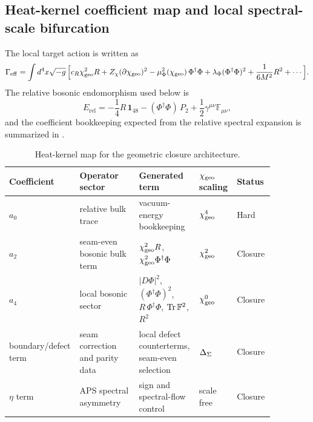 \subsection{Heat-kernel coefficient map and local spectral-scale bifurcation}

The local target action is written as
\begin{equation}
\label{eq:chi-effective-action}
\begin{aligned}
\Gamma_{\mathrm{eff}}
=
\int d^4x\sqrt{-g}\,
\Big[
c_R\chi_{\mathrm{geo}}^2R
+Z_\chi(\partial\chi_{\mathrm{geo}})^2
-\mu_\Phi^2(\chi_{\mathrm{geo}})\,\Phi^\dagger\Phi
+\lambda_\Phi(\Phi^\dagger\Phi)^2
+\frac{1}{6M^2}R^2
+\cdots
\Big].
\end{aligned}
\end{equation}
The relative bosonic endomorphism used below is
\begin{equation}
\label{eq:relative-bosonic-endomorphism}
E_{\mathrm{rel}}
=
-\frac14 R\,\mathbf 1_{48}
-
(\Phi^\dagger\Phi)\,P_2
+
\frac12\gamma^{\mu\nu}\mathbb F_{\mu\nu},
\end{equation}
and the coefficient bookkeeping expected from the relative spectral expansion is summarized in .

\begin{table}[t]
\centering
\small
\begin{tabularx}{\linewidth}{@{}>{\raggedright\arraybackslash}p{0.15\linewidth}>{\raggedright\arraybackslash}p{0.22\linewidth}>{\raggedright\arraybackslash}p{0.22\linewidth}>{\raggedright\arraybackslash}p{0.14\linewidth}>{\raggedright\arraybackslash}p{0.14\linewidth}@{}}
\toprule
Coefficient & Operator sector & Generated term & $\chi_{\mathrm{geo}}$ scaling & Status \\
\midrule
$a_0$ & relative bulk trace & vacuum-energy bookkeeping & $\chi_{\mathrm{geo}}^4$ & Hard \\
$a_2$ & seam-even bosonic bulk term & $\chi_{\mathrm{geo}}^2R$, $\chi_{\mathrm{geo}}^2\Phi^\dagger\Phi$ & $\chi_{\mathrm{geo}}^2$ & Closure \\
$a_4$ & local bosonic sector & $|D\Phi|^2$, $(\Phi^\dagger\Phi)^2$, $R\,\Phi^\dagger\Phi$, $\operatorname{Tr}\mathbb F^2$, $R^2$ & $\chi_{\mathrm{geo}}^0$ & Closure \\
boundary/defect term & seam correction and parity data & local defect counterterms, seam-even selection & $\Delta_{\Sigma}$ & Closure \\
$\eta$ term & APS spectral asymmetry & sign and spectral-flow control & scale free & Closure \\
\bottomrule
\end{tabularx}
\caption{Heat-kernel map for the geometric closure architecture.}
\label{tab:heat-kernel-map}
\end{table}


